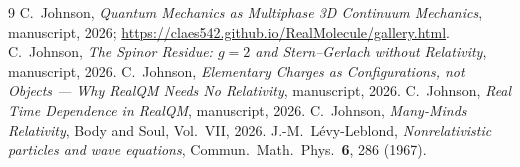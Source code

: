 \documentclass[11pt]{article}
\begin{document}
\begin{thebibliography}{9}
 C.~Johnson, \emph{Quantum Mechanics as Multiphase 3D Continuum Mechanics}, manuscript, 2026;
\url{https://claes542.github.io/RealMolecule/gallery.html}.
 C.~Johnson, \emph{The Spinor Residue: $g=2$ and Stern--Gerlach without Relativity}, manuscript,
2026.
 C.~Johnson, \emph{Elementary Charges as Configurations, not Objects --- Why RealQM Needs No
Relativity}, manuscript, 2026.
 C.~Johnson, \emph{Real Time Dependence in RealQM}, manuscript, 2026.
 C.~Johnson, \emph{Many-Minds Relativity}, Body and Soul, Vol.~VII, 2026.
 J.-M.~L\'evy-Leblond, \emph{Nonrelativistic particles and wave equations}, Commun.\ Math.\
Phys.\ \textbf{6}, 286 (1967).
\end{thebibliography}
\end{document}
